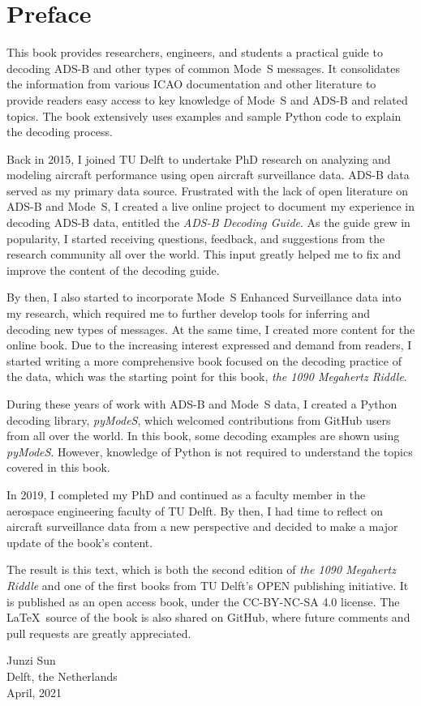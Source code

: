 \chapter*{Preface}

\vspace{-0.3cm}

{
This book provides researchers, engineers, and students a practical guide to decoding ADS-B and other types of common Mode~S messages. It consolidates the information from various ICAO documentation and other literature to provide readers easy access to key knowledge of Mode~S and ADS-B and related topics. The book extensively uses examples and sample Python code to explain the decoding process.

Back in 2015, I joined TU Delft to undertake PhD research on analyzing and modeling aircraft performance using open aircraft surveillance data. ADS-B data served as my primary data source. Frustrated with the lack of open literature on ADS-B and Mode~S, I created a live online project to document my experience in decoding ADS-B data, entitled the \emph{ADS-B Decoding Guide}. As the guide grew in popularity, I started receiving questions, feedback, and suggestions from the research community all over the world. This input greatly helped me to fix and improve the content of the decoding guide.

By then, I also started to incorporate Mode~S Enhanced Surveillance data into my research, which required me to further develop tools for inferring and decoding new types of messages. At the same time, I created more content for the online book. Due to the increasing interest expressed and demand from readers, I started writing a more comprehensive book focused on the decoding practice of the data, which was the starting point for this book, \emph{the 1090 Megahertz Riddle}.

During these years of work with ADS-B and Mode~S data, I created a Python decoding library, \emph{pyModeS}, which welcomed contributions from GitHub users from all over the world. In this book, some decoding examples are shown using \emph{pyModeS}. However, knowledge of Python is not required to understand the topics covered in this book.

In 2019, I completed my PhD and continued as a faculty member in the aerospace engineering faculty of TU Delft. By then, I had time to reflect on aircraft surveillance data from a new perspective and decided to make a major update of the book's content.

The result is this text, which is both the second edition of \emph{the 1090 Megahertz Riddle} and one of the first books from TU Delft's OPEN publishing initiative. It is published as an open access book, under the CC-BY-NC-SA 4.0 license. The \LaTeX~source of the book is also shared on GitHub, where future comments and pull requests are greatly appreciated.

\vspace{0.4cm}

\begin{flushright}
  Junzi Sun \\
  Delft, the Netherlands \\
  April, 2021
\end{flushright}
}